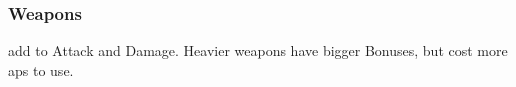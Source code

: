 \subsubsection{Weapons}
add to Attack and Damage.
Heavier weapons have bigger Bonuses, but cost more \glspl{ap} to use.
